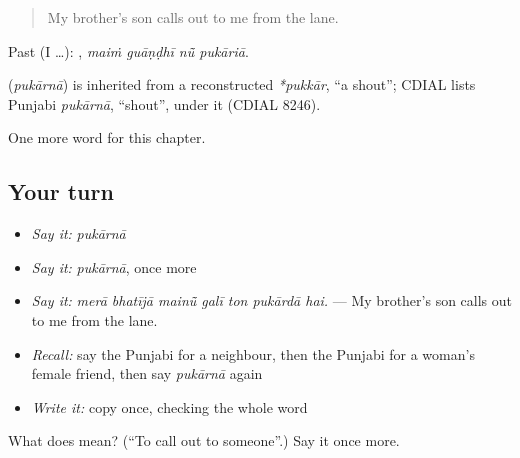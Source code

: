 \begin{quote}
My brother's son calls out to me from the lane.
\end{quote}

Past (I …):    , \emph{maiṁ guāṇḍhī nū̃ pukāriā}.

\begin{cousinweb}
\textbf{} (\emph{pukārnā}) is inherited from a reconstructed \emph{*pukkār}, \textquotedblleft{}a shout\textquotedblright{}; CDIAL lists Punjabi \emph{pukārnā}, \textquotedblleft{}shout\textquotedblright{}, under it (CDIAL 8246).
\end{cousinweb}

\begin{grammarlens}[title={What you've built}]
One more word for this chapter.
\end{grammarlens}

\subsection*{Your turn}
\begin{itemize}
\raggedright
  \item \emph{Say it:} \emph{pukārnā}
  \item \emph{Say it:} \emph{pukārnā}, once more
  \item \emph{Say it:} \emph{merā bhatījā mainū̃ galī ton pukārdā hai.} — My brother's son calls out to me from the lane.
  \item \emph{Recall:} say the Punjabi for a neighbour, then the Punjabi for a woman's female friend, then say \emph{pukārnā} again
  \item \emph{Write it:} copy \textbf{} once, checking the whole word
\end{itemize}

\begin{tcolorbox}[breakable,colback=teal!4,colframe=teal!35!black,title={Before you move on}]
What does  mean? (\textquotedblleft{}To call out to someone\textquotedblright{}.) Say it once more.
\end{tcolorbox}
